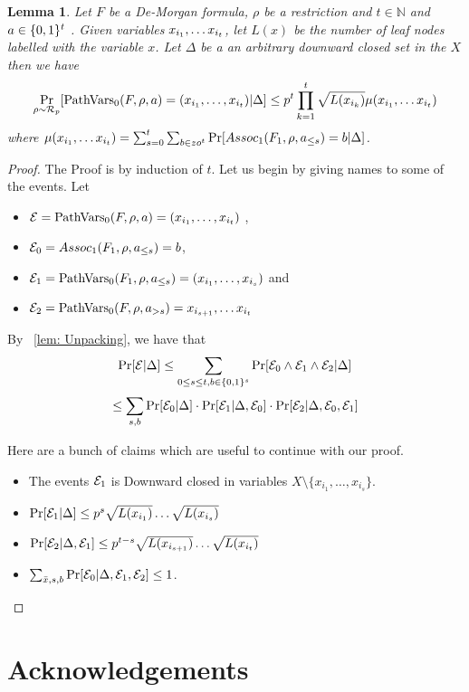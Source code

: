 \documentclass[11pt]{article}
\newtheorem{lemma}[theorem]{Lemma}
\begin{document}
\begin{lemma}
    Let $F$ be a De-Morgan formula, $\rho$ be a restriction and $t \in \mathbb{N}$ and $a \in \{0,1\}^t$ . Given variables $x_{i_{1}}, \dots x_{i_{t}}$, let $L(x)$ be the number of leaf nodes labelled with the variable $x$. Let $\Delta$ be a an arbitrary downward closed set in the $X$ then we have 
        $$\Pr_{\rho \sim \mathcal{R}_p}[\mathrm{PathVars}_0(F,\rho,a) = (x_{i_1}, \dots ,x_{i_t})|\Delta] \le p^t \prod_{k = 1}^t \sqrt{L(x_{i_k})}\mu(x_{i_{1}}, \dots x_{i_{t}})$$
    where $\mu(x_{i_{1}}, \dots x_{i_{t}}) = \sum_{s = 0}^t \sum_{b \in zo^t}\Pr[Assoc_1(F_1,\rho,a_{\le s}) = b|\Delta]$. 
\end{lemma}
\begin{proof}
    The Proof is by induction of $t$. 
    Let us begin by giving names to some of the events. Let 
    \begin{itemize}
        \item $\mathcal{E} = \mathrm{PathVars}_0(F,\rho,a) = (x_{i_1}, \dots ,x_{i_t})$ ,
        \item $\mathcal{E}_0 = Assoc_1(F_1,\rho,a_{\le s}) = b$, 
        \item $\mathcal{E}_1 = \mathrm{PathVars}_0(F_1,\rho,a_{\le s}) = (x_{i_1}, \dots ,x_{i_s})$ and 
        \item $\mathcal{E}_2 = \mathrm{PathVars}_0(F,\rho,a_{>s}) = x_{i_{s+1}}, \dots x_{i_t}$
    \end{itemize}

    By ~\cref{lem: Unpacking}, we have that 
    $$\Pr[\mathcal{E}|\Delta] \le \sum_{0 \le s \le t, b \in \{0,1\}^s} \Pr[\mathcal{E}_0 \land \mathcal{E}_1 \land \mathcal{E}_2 |\Delta]$$
    $$\le \sum_{s,b} \Pr[\mathcal{E}_0 |\Delta] 
    \cdot \Pr[\mathcal{E}_1|\Delta ,\mathcal{E}_0]
    \cdot \Pr[\mathcal{E}_2|\Delta,\mathcal{E}_0, \mathcal{E}_1]$$
   
    Here are a bunch of claims which are useful to continue with our proof. 
    \begin{itemize}
        \item The events  $\mathcal{E}_1$ is Downward closed in variables $X \setminus \{x_{i_1}, \dots , x_{i_s}\}$.
        \item $\Pr[\mathcal{E}_1|\Delta] \le p^s\sqrt{L(x_{i_1})} \dots \sqrt{L(x_{i_s})}$
        \item $\Pr[\mathcal{E}_2|\Delta,\mathcal{E}_1] \le p^{t-s}\sqrt{L(x_{i_{s+1}})} \dots \sqrt{L(x_{i_t})}$
        \item $\sum_{\bar{x}, s ,b} \Pr[\mathcal{E}_0|\Delta, \mathcal{E}_1, \mathcal{E}_2] \le 1$.
    \end{itemize}
\end{proof}





\section*{Acknowledgements}

\end{document}
